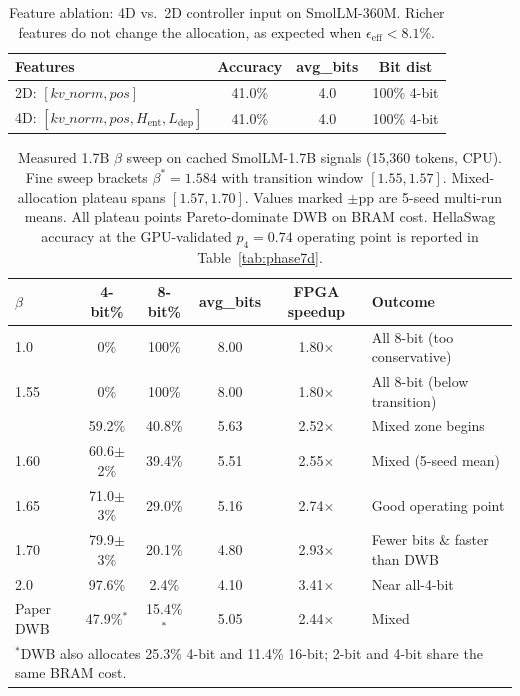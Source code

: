\documentclass{article}
\begin{document}
\begin{table}[h]
\centering
\caption{Feature ablation: 4D vs.\ 2D controller input on SmolLM-360M. Richer features do not change the allocation, as expected when $\epsilon_\text{eff}<8.1\%$.}
\begin{tabular}{lccc}
\toprule
Features & Accuracy & avg\_bits & Bit dist \\
\midrule
2D: $[kv\_norm, pos]$ & 41.0\% & 4.0 & 100\% 4-bit \\
4D: $[kv\_norm, pos, H_\text{ent}, L_\text{dep}]$ & 41.0\% & 4.0 & 100\% 4-bit \\
\bottomrule
\end{tabular}
\label{tab:features}
\end{table}

\begin{table}[h]
\centering
\caption{Measured 1.7B $\beta$ sweep on cached SmolLM-1.7B signals (15,360 tokens, CPU). Fine sweep brackets $\beta^*{=}1.584$ with transition window $[1.55, 1.57]$. Mixed-allocation plateau spans $[1.57, 1.70]$. Values marked $\pm\text{pp}$ are 5-seed multi-run means. All plateau points Pareto-dominate DWB on BRAM cost. HellaSwag accuracy at the GPU-validated $p_4{=}0.74$ operating point is reported in Table~\ref{tab:phase7d}.}
\begin{tabular}{lccccl}
\toprule
$\beta$ & 4-bit\% & 8-bit\% & avg\_bits & FPGA speedup & Outcome \\
\midrule
1.0  & 0\%   & 100\% & 8.00 & 1.80$\times$ & All 8-bit (too conservative) \\
1.55 & 0\%   & 100\% & 8.00 & 1.80$\times$ & All 8-bit (below transition) \\
\hdashline
1.57 & 59.2\% & 40.8\% & 5.63 & 2.52$\times$ & Mixed zone begins \\
1.60 & 60.6$\pm$2\% & 39.4\% & 5.51 & 2.55$\times$ & Mixed (5-seed mean) \\
1.65 & 71.0$\pm$3\% & 29.0\% & 5.16 & 2.74$\times$ & Good operating point \\
1.70 & 79.9$\pm$3\% & 20.1\% & 4.80 & 2.93$\times$ & Fewer bits \& faster than DWB \\
2.0  & 97.6\% & 2.4\% & 4.10 & 3.41$\times$ & Near all-4-bit \\
\midrule
Paper DWB & 47.9\%$^*$ & 15.4\%$^*$ & 5.05 & 2.44$\times$ & Mixed \\
\bottomrule
\multicolumn{6}{l}{\small $^*$DWB also allocates 25.3\% 4-bit and 11.4\% 16-bit; 2-bit and 4-bit share the same BRAM cost.}
\end{tabular}
\label{tab:sim_1b7}
\end{table}
\end{document}
